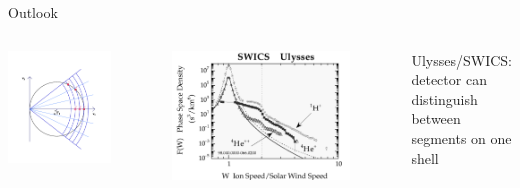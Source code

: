 \documentclass{beamer}
\begin{document}
\begin{frame}{Outlook}
	\begin{columns}
		\column{6cm}
		\flushleft
		\includegraphics[scale=0.9]{pictures/detektor3.pdf}
		\column{5cm}
		\begin{figure}
		\includegraphics[scale=0.18]{pictures/sw_pui_gloeckler.png}	
		\end{figure}
		\begin{columns}
		\column{3.5cm}
		Ulysses/SWICS: \\detector can distinguish between segments on one shell
		\column{1.5cm}
		\end{columns}
		
	\end{columns}
\end{frame}
\end{document}

